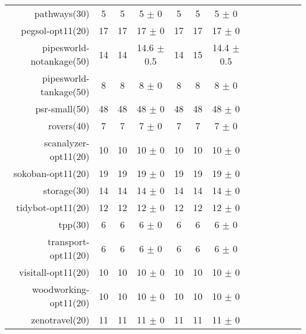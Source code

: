 \begin{center}
\begin{tabular}{|r|*{4}{ccc|}}
pathways(30) & 5 & 5 & 5 \(\pm\) 0 & 5 & 5 & 5 \(\pm\) 0\\
pegsol-opt11(20) & 17 & 17 & 17 \(\pm\) 0 & 17 & 17 & 17 \(\pm\) 0\\
pipesworld-notankage(50) & 14 & 14 & 14.6 \(\pm\) 0.5 & 14 & 15 & 14.4 \(\pm\) 0.5\\
pipesworld-tankage(50) & 8 & 8 & 8 \(\pm\) 0 & 8 & 8 & 8 \(\pm\) 0\\
psr-small(50) & 48 & 48 & 48 \(\pm\) 0 & 48 & 48 & 48 \(\pm\) 0\\
rovers(40) & 7 & 7 & 7 \(\pm\) 0 & 7 & 7 & 7 \(\pm\) 0\\
scanalyzer-opt11(20) & 10 & 10 & 10 \(\pm\) 0 & 10 & 10 & 10 \(\pm\) 0\\
sokoban-opt11(20) & 19 & 19 & 19 \(\pm\) 0 & 19 & 19 & 19 \(\pm\) 0\\
storage(30) & 14 & 14 & 14 \(\pm\) 0 & 14 & 14 & 14 \(\pm\) 0\\
tidybot-opt11(20) & 12 & 12 & 12 \(\pm\) 0 & 12 & 12 & 12 \(\pm\) 0\\
tpp(30) & 6 & 6 & 6 \(\pm\) 0 & 6 & 6 & 6 \(\pm\) 0\\
transport-opt11(20) & 6 & 6 & 6 \(\pm\) 0 & 6 & 6 & 6 \(\pm\) 0\\
visitall-opt11(20) & 10 & 10 & 10 \(\pm\) 0 & 10 & 10 & 10 \(\pm\) 0\\
woodworking-opt11(20) & 10 & 10 & 10 \(\pm\) 0 & 10 & 10 & 10 \(\pm\) 0\\
zenotravel(20) & 11 & 11 & 11 \(\pm\) 0 & 11 & 11 & 11 \(\pm\) 0\\
\end{tabular}
\end{center}
